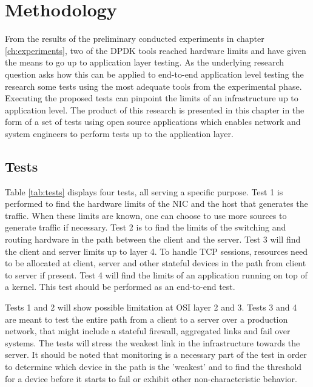 \chapter{Methodology}\label{ch:method}
From the results of the preliminary conducted experiments in chapter \ref{ch:experiments}, two of the DPDK tools reached hardware limits and have given the means to go up to application layer testing.  
As the underlying research question asks how this can be applied to end-to-end application level testing the research some tests using the most adequate tools from the experimental phase.
Executing the proposed tests can pinpoint the limits of an infrastructure up to application level.
The product of this research is presented in this chapter in the form of a set of tests using open source applications which enables network and system engineers to perform tests up to the application layer.

\section{Tests}\label{sec:tests}

Table \ref{tab:tests} displays four tests, all serving a specific purpose.
Test 1 is performed to find the hardware limits of the NIC and the host that generates the traffic. 
When these limits are known, one can choose to use more sources to generate traffic if necessary.  
Test 2 is to find the limits of the  switching and routing hardware in the path between the client and the server.
Test 3 will find the client and server limits up to layer 4. To handle TCP sessions, resources need to be allocated at client, server and other stateful devices in the path from client to server if present. 
Test 4 will find the limits of an application running on top of a kernel. This test should be performed as an end-to-end test.  

Tests 1 and 2 will show possible limitation at OSI layer 2 and 3. 
Tests 3 and 4 are meant to test the entire path from a client to a server over a production network, that might include a stateful firewall, aggregated links and fail over systems. 
The tests will stress the weakest link in the infrastructure towards the server.  
It should be noted that monitoring is a necessary part of the test in order to determine which device in the path is the 'weakest' and to find the threshold for a device before it starts to fail or exhibit other non-characteristic behavior. 


